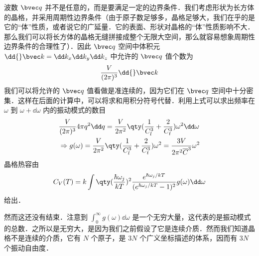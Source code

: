 波数 $\bvec q$ 并不是任意的，而是要满足一定的边界条件．我们考虑形状为长方体的晶格，并采用周期性边界条件（由于原子数足够多，晶格足够大，我们在乎的是它的“体”性质，或者说它的广延量．它的表面、形状对晶格的“体”性质影响不大．那么我们可以将长方体的晶格无缝拼接成整个无限大空间，那么就容易想象周期性边界条件的合理性了）．因此 $\bvec q$ 空间中体积元 $\dd{} \bvec k=\dd k_x\dd k_y\dd k_z$ 中允许的 $\bvec q$ 值个数为
\begin{equation}
\frac{V}{(2\pi)^3} \dd{} \bvec k
\end{equation}
我们可以将允许的 $\bvec q$ 值看做是准连续的，因为它们在 $\bvec q$ 空间中十分密集．这样在后面的计算中，可以将求和用积分符号代替．利用上式可以求出频率在 $\omega$ 到 $\omega+\dd \omega$ 内的振动模式的数目
\begin{equation}
\begin{aligned}
&\frac{V}{(2\pi)^3}4\pi q^2\dd q=\frac{V}{2\pi^2}\qty(\frac{1}{C_l^3}+\frac{2}{C_t^3})\omega^2\dd \omega\\
&\Rightarrow g(\omega)= \frac{V}{2\pi^2}\qty(\frac{1}{C_l^3}+\frac{2}{C_t^3}) \omega^2=\frac{3V}{2\pi^2 \overline C ^3} \omega^2
\end{aligned}
\end{equation}
晶格热容由
\begin{equation}
C_V(T)=k \int \qty(\frac{\hbar\omega_j}{kT})^2\frac{e^{\hbar \omega_j/kT}}{(e^{\hbar\omega_j/kT}-1)^2} g(\omega)\dd \omega
\end{equation}
给出．

然而这还没有结束．注意到 $\int_0^\infty g(\omega)\dd \omega$ 是一个无穷大量，这代表的是振动模式的总数．之所以是无穷大，是因为我们之前假设了它是连续介质．然而我们知道晶格不是连续的介质，它有 $N$ 个原子，是 $3N$ 个广义坐标描述的体系，因而有 $3N$ 个振动自由度．